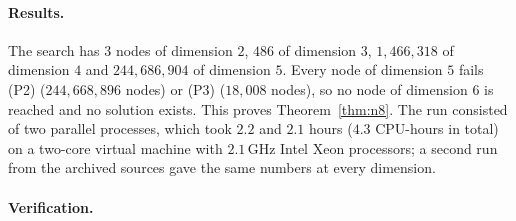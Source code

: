 \documentclass[11pt]{article}
\theoremstyle{definition}
\begin{document}
\paragraph{Results.} The search has $3$ nodes of dimension $2$, $486$ of dimension $3$,
$1{,}466{,}318$ of dimension $4$ and $244{,}686{,}904$ of dimension $5$. Every node of dimension
$5$ fails (P2) ($244{,}668{,}896$ nodes) or (P3) ($18{,}008$ nodes), so no node of dimension $6$
is reached and no solution exists. This proves Theorem~\ref{thm:n8}. The run consisted of two
parallel processes, which took $2.2$ and $2.1$ hours ($4.3$ CPU-hours in total) on a two-core
virtual machine with $2.1$\,GHz Intel Xeon processors; a second run from the archived sources
gave the same numbers at every dimension.

\paragraph{Verification.}
\end{document}
